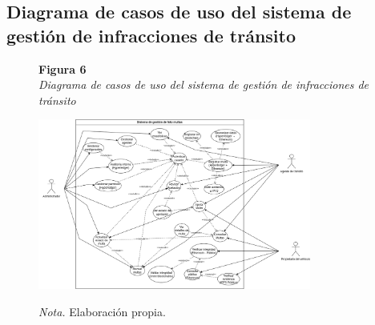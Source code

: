 \subsection{Diagrama de casos de uso del sistema de gestión de infracciones de tránsito}
\begin{figure}[htbp]
    \begin{flushleft}
        \textbf{Figura 6}\\[2em]
        \textit{Diagrama de casos de uso del sistema de gestión de infracciones de tránsito}
    \end{flushleft}
    \vspace{1em}
    \centering
    \includegraphics[width=0.8\textwidth]{Images/CasosUso.png}
    \vspace{2em}
    \begin{flushleft}
        \textit{Nota.} Elaboración propia.
    \end{flushleft}
    \label{fig:casos_uso}
\end{figure}

